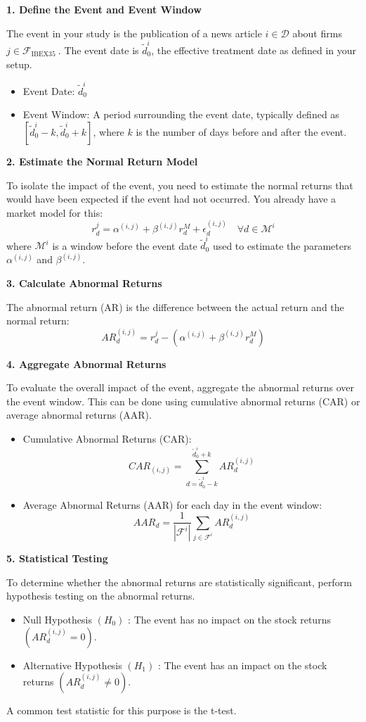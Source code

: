 \textbf{1. Define the Event and Event Window}

The event in your study is the publication of a news article $i \in \mathcal{D}$ about firms $j \in \mathcal{F}_{\text {IBEX35 }}$. The event date is $\tilde{d}_0^i$, the effective treatment date as defined in your setup.
\begin{itemize}
  \item Event Date: $\tilde{d}_0^i$
  \item Event Window: A period surrounding the event date, typically defined as $\left[\tilde{d}_0^i-k, \tilde{d}_0^i+k\right]$, where $k$ is the number of days before and after the event.
\end{itemize}


\bx 
\noindent \textbf{2. Estimate the Normal Return Model}

To isolate the impact of the event, you need to estimate the normal returns that would have been expected if the event had not occurred. You already have a market model for this:
$$
r_d^j=\alpha^{(i, j)}+\beta^{(i, j)} r_d^M+\epsilon_d^{(i, j)} \quad \forall d \in \mathcal{M}^i
$$
where $\mathcal{M}^i$ is a window before the event date $\tilde{d}_0^i$ used to estimate the parameters $\alpha^{(i, j)}$ and $\beta^{(i, j)}$.


\bx 
\textbf{3. Calculate Abnormal Returns}

The abnormal return (AR) is the difference between the actual return and the normal return:
$$
A R_d^{(i, j)}=r_d^j-\left(\alpha^{(i, j)}+\beta^{(i, j)} r_d^M\right)
$$

\bx 
\textbf{4. Aggregate Abnormal Returns}

To evaluate the overall impact of the event, aggregate the abnormal returns over the event window. This can be done using cumulative abnormal returns (CAR) or average abnormal returns (AAR).
\begin{itemize}
  \item Cumulative Abnormal Returns (CAR):
$$
C A R_{(i, j)}=\sum_{d=\tilde{d}_0^i-k}^{\tilde{d}_0^i+k} A R_d^{(i, j)}
$$
	\item Average Abnormal Returns (AAR) for each day in the event window:
$$
A A R_d=\frac{1}{\left|\mathcal{F}^i\right|} \sum_{j \in \mathcal{F}^i} A R_d^{(i, j)}
$$
\end{itemize}


\bx 
\textbf{5. Statistical Testing}

To determine whether the abnormal returns are statistically significant, perform hypothesis testing on the abnormal returns.
\begin{itemize}
  \item Null Hypothesis $\left(H_0\right)$ : The event has no impact on the stock returns $\left(A R_d^{(i, j)}=0\right)$.
  \item Alternative Hypothesis $\left(H_1\right)$ : The event has an impact on the stock returns $\left(A R_d^{(i, j)} \neq 0\right)$.
\end{itemize}


A common test statistic for this purpose is the t-test.
